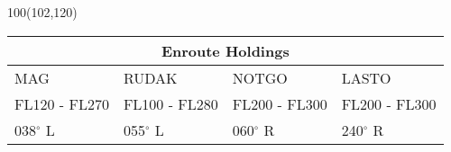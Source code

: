 \documentclass[10pt,landscape,a4paper]{article}
\begin{document}
\begin{textblock}{100}(102,120)
\begin{table}[]
\begin{tabular}{|l|l|l|l|}
\multicolumn{4}{c}{\textbf{Enroute Holdings}} \\ \hline
MAG    			& RUDAK 			& NOTGO & LASTO    \\ 
FL120 - FL270    	& FL100 - FL280 	& FL200 - FL300 & FL200 - FL300    \\ 
038$^\circ$ L   	& 055$^\circ$ L 	& 060$^\circ$ R 	& 240$^\circ$ R    \\ \hline
\end{tabular}
\end{table}
\end{textblock}
\end{document}
